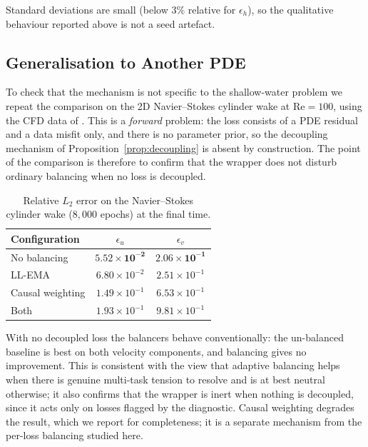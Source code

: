 \documentclass[a4paper,fleqn]{cas-sc}
\begin{document}
Standard deviations are small (below $3\%$ relative for $\epsilon_h$), so the
qualitative behaviour reported above is not a seed artefact.

\subsection{Generalisation to Another PDE}

To check that the mechanism is not specific to the shallow-water problem we
repeat the comparison on the 2D Navier--Stokes cylinder wake at
$\mathrm{Re}=100$, using the CFD data of \citep{raissi2019physics}. This is a
\emph{forward} problem: the loss consists of a PDE residual and a data misfit
only, and there is no parameter prior, so the decoupling mechanism of
Proposition~\ref{prop:decoupling} is absent by construction. The point of the
comparison is therefore to confirm that the wrapper does not disturb ordinary
balancing when no loss is decoupled.

\begin{table}[t]
\centering
\caption{Relative $L_2$ error on the Navier--Stokes cylinder wake
($8{,}000$ epochs) at the final time.}
\label{tab:ns}
\begin{tabular}{lcc}
\toprule
Configuration & $\epsilon_u$ & $\epsilon_v$ \\
\midrule
No balancing & $\mathbf{5.52\times10^{-2}}$ & $\mathbf{2.06\times10^{-1}}$ \\
LL-EMA & $6.80\times10^{-2}$ & $2.51\times10^{-1}$ \\
Causal weighting & $1.49\times10^{-1}$ & $6.53\times10^{-1}$ \\
Both & $1.93\times10^{-1}$ & $9.81\times10^{-1}$ \\
\bottomrule
\end{tabular}
\end{table}

With no decoupled loss the balancers behave conventionally: the un-balanced
baseline is best on both velocity components, and balancing gives no
improvement. This is consistent with the view that adaptive balancing helps
when there is genuine multi-task tension to resolve and is at best neutral
otherwise; it also confirms that the wrapper is inert when nothing is
decoupled, since it acts only on losses flagged by the diagnostic. Causal
weighting degrades the result, which we report for completeness; it is a
separate mechanism from the per-loss balancing studied here.

\end{document}
